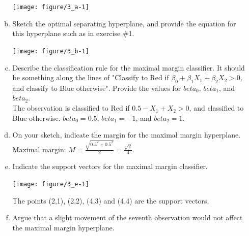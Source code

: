 \documentclass[12pt,fleqn]{article}\usepackage[]{graphicx}\usepackage[]{color}
\newenvironment{knitrout}{}{} %
\theoremstyle{definition}
\begin{document}
\begin{enumerate}[1.]
\begin{enumerate}[(a)]
\begin{knitrout}
{\centering \texttt{[image: figure/3\_a-1]} 

}



\end{knitrout}

          \item Sketch the optimal separating hyperplane, and provide the equation for this hyperplane such as in exercise \#1.\\
\begin{knitrout}
\color{fgcolor}

{\centering \texttt{[image: figure/3\_b-1]} 

}



\end{knitrout}

          \item Describe the classification rule for the maximal margin classifier. It should be something along the lines of "Classify to Red if $\beta_{0}+\beta_{1} X_{1}+\beta_{2} X_{2}>0$, and classify to Blue otherwise". Provide the values for $beta_0$, $beta_1$, and $beta_2$.\\
          The observation is classified to Red if $0.5 - X_{1} + X_{2}>0$, and classified to Blue otherwise. $beta_0 = 0.5$, $beta_1 = -1$, and $beta_2 = 1$.
          \item On your sketch, indicate the margin for the maximal margin hyperplane.\\
          Maximal margin: $M=\frac{\sqrt{0.5^2+0.5^2}}{2}=\frac{\sqrt{2}}{4}$.
          \item Indicate the support vectors for the maximal margin classifier.\\
\begin{knitrout}
\color{fgcolor}

{\centering \texttt{[image: figure/3\_e-1]} 

}



\end{knitrout}
        The points (2,1), (2,2), (4,3) and (4,4) are the support vectors.
          \item Argue that a slight movement of the seventh observation would not affect the maximal margin hyperplane.
\begin{knitrout}
\color{fgcolor}


\end{knitrout}
\end{enumerate}
\end{enumerate}
\end{document}
